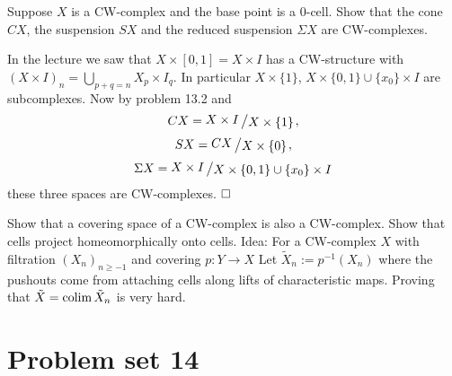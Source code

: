 \documentclass[11pt]{book}
\numberwithin{dummy}{section}
\theoremstyle{nonumberbreak}
\newenvironment{sol}[1][]{\ifthenelse{\equal{#1}{}}{\solution}{\solution[#1]}\rm}{\endsolution}
\newenvironment{prob}[1][]{\ifthenelse{\equal{#1}{}}{\problem}{\problem[#1]}\rm}{\endproblem}
\newcommand{\la}{\longrightarrow}
\newcommand{\slant}[2]{{\raisebox{.1em}{$#1$}\left/\raisebox{-.1em}{$#2$}\right.}}
\begin{document}
\begin{spacing}{1.4}
\begin{prob}
\begin{sol}
\begin{compactenum}
\end{compactenum}


\end{sol}
\end{prob}

\begin{prob} %
Suppose $X$ is a CW-complex and the base point is a $0$-cell. Show that the cone $CX$, the suspension $SX$ and the reduced suspension $\Sigma X$ are CW-complexes.

\begin{sol}
In the lecture we saw that $X \times [0,1] = X \times I$ has a CW-structure with $(X \times I)_n = \bigcup_{p+q=n} X_p \times I_q$. In particular $X \times \{1\}$, $X \times \{0,1\} \cup \{x_0\} \times I$ are subcomplexes. Now by problem 13.2 and 
$$CX = \slant{X \times I}{X\times \{1\}},$$
$$SX =\slant{CX}{X \times \{0\}},$$
$$\Sigma X = \slant{X \times I}{X \times \{0,1\} \cup \{x_0\} \times I}$$
these three spaces are CW-complexes. $\hfill \Box$

\end{sol}

\end{prob}


\begin{prob} %
Show that a covering space of a CW-complex is also a CW-complex. Show that cells project homeomorphically onto cells.
\begin{sol}
Idea: For a CW-complex $X$ with filtration $(X_n)_{n \geqslant -1}$ and covering $p:Y \la X$ Let $\tilde{X}_n := p^{-1}(X_n)$ where the pushouts come from attaching cells along lifts of characteristic maps. Proving that $\tilde{X} =\mathrm{colim} \hspace{1.5pt} \tilde{X}_n$ is very hard.
\end{sol}
\end{prob}







\newpage 




\titlespacing*{\section}{-16.5pt}{0pt}{20pt}
\renewcommand*\thesection{}
\section{Problem set 14} %
\renewcommand*\thesection{\arabic{section}}



\end{spacing}
\end{document}
